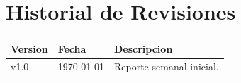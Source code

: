 ﻿\documentclass[a4paper, twoside, 12pt]{report}
\begin{document}

\begin{abstract}
    Escribe aqui un resumen corto de la semana.
\end{abstract}

\chapter*{Historial de Revisiones}
\begin{center}
\begin{tabular}{p{2cm} p{3cm} p{9cm}}
\toprule
\textbf{Version} & \textbf{Fecha} & \textbf{Descripcion} \\
\midrule
v1.0 & \today & Reporte semanal inicial. \\
\bottomrule
\end{tabular}
\end{center}

\clearpage
\tableofcontents
\listoffigures
\listoftables
\clearpage








% 
% 
\end{document}
